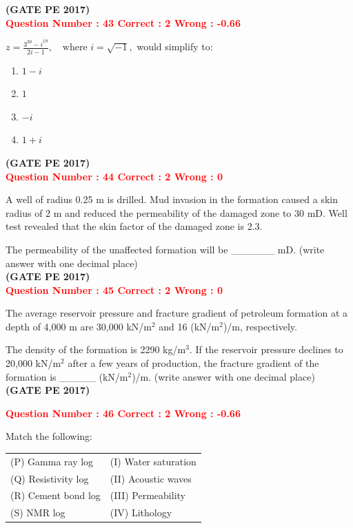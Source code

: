 \documentclass[12pt]{article}
\begin{document}
{\hfill\textbf{(GATE PE 2017)}\\[0.6cm]

\textcolor{red}{\textbf{Question Number : 43 \hfill Correct : 2  Wrong : -0.66}}

{\LARGE$
z = \frac{3^{30} - i^{19}}{2i - 1}, \quad \text{where } i = \sqrt{-1},
$ }
would simplify to:

\begin{enumerate}[label=(\Alph*)]
    \item $1 - i$
    \item $1$
    \item $-i$
    \item $1 + i$
\end{enumerate}
\hfill\textbf{(GATE PE 2017)}\\[0.6cm]

\textcolor{red}{\textbf{Question Number : 44 \hfill Correct : 2  Wrong : 0}}

A well of radius 0.25 m is drilled. Mud invasion in the formation caused a skin radius of 2 m and reduced the permeability of the damaged zone to 30 mD. Well test revealed that the skin factor of the damaged zone is 2.3.

The permeability of the unaffected formation will be \_\_\_\_\_\_ mD. (write answer with one decimal place)\\

\hfill\textbf{(GATE PE 2017)}\\[0.6cm]

\textcolor{red}{\textbf{Question Number : 45 \hfill Correct : 2  Wrong : 0}}

The average reservoir pressure and fracture gradient of petroleum formation at a depth of 4,000 m are 30,000 kN/m$^2$ and 16 (kN/m$^2$)/m, respectively.

The density of the formation is 2290 kg/m$^3$. If the reservoir pressure declines to 20,000 kN/m$^2$ after a few years of production, the fracture gradient of the formation is \_\_\_\_\_ (kN/m$^2$)/m. (write answer with one decimal place)\\

\hfill\textbf{(GATE PE 2017)}\\[0.6cm]

\newpage

\textcolor{red}{\textbf{Question Number : 46 \hfill Correct : 2  Wrong : -0.66}}

Match the following:

\begin{tabular}{ll}
(P) Gamma ray log & (I) Water saturation \\
(Q) Resistivity log & (II) Acoustic waves \\
(R) Cement bond log & (III) Permeability \\
(S) NMR log & (IV) Lithology \\
\end{tabular}

}
\end{document}

